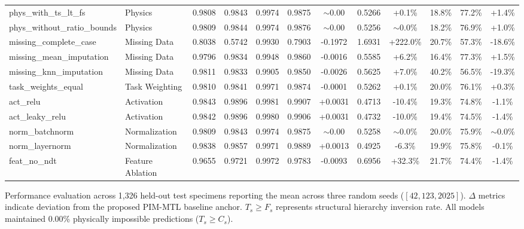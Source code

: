 \documentclass[conference]{IEEEtran}
\begin{document}
\begin{table}[t]
\begin{tabular*}{\textwidth}{@{\extracolsep{\fill}} l l c c c c c c c c c c @{}}
phys\_with\_ts\_lt\_fs & Physics & 0.9808 & 0.9843 & 0.9974 & 0.9875 & $\sim$0.00 & 0.5266 & +0.1\% & 18.8\% & 77.2\% & +1.4\% \\
phys\_without\_ratio\_bounds & Physics & 0.9809 & 0.9844 & 0.9974 & 0.9876 & $\sim$0.00 & 0.5256 & $\sim$0.0\% & 18.2\% & 76.9\% & +1.0\% \\
\midrule
missing\_complete\_case & Missing Data & 0.8038 & 0.5742 & 0.9930 & 0.7903 & -0.1972 & 1.6931 & +222.0\% & 20.7\% & 57.3\% & -18.6\% \\
missing\_mean\_imputation & Missing Data & 0.9796 & 0.9834 & 0.9948 & 0.9860 & -0.0016 & 0.5585 & +6.2\% & 16.4\% & 77.3\% & +1.5\% \\
missing\_knn\_imputation & Missing Data & 0.9811 & 0.9833 & 0.9905 & 0.9850 & -0.0026 & 0.5625 & +7.0\% & 40.2\% & 56.5\% & -19.3\% \\
\midrule
task\_weights\_equal & Task Weighting & 0.9810 & 0.9841 & 0.9971 & 0.9874 & -0.0001 & 0.5262 & +0.1\% & 20.0\% & 76.1\% & +0.3\% \\
\midrule
act\_relu & Activation & 0.9843 & 0.9896 & 0.9981 & 0.9907 & +0.0031 & 0.4713 & -10.4\% & 19.3\% & 74.8\% & -1.1\% \\
act\_leaky\_relu & Activation & 0.9842 & 0.9896 & 0.9980 & 0.9906 & +0.0031 & 0.4732 & -10.0\% & 19.4\% & 74.5\% & -1.4\% \\
\midrule
norm\_batchnorm & Normalization & 0.9809 & 0.9843 & 0.9974 & 0.9875 & $\sim$0.00 & 0.5258 & $\sim$0.0\% & 20.0\% & 75.9\% & $\sim$0.0\% \\
norm\_layernorm & Normalization & 0.9838 & 0.9857 & 0.9971 & 0.9889 & +0.0013 & 0.4925 & -6.3\% & 19.9\% & 75.8\% & -0.1\% \\
\midrule
feat\_no\_ndt & Feature Ablation & 0.9655 & 0.9721 & 0.9972 & 0.9783 & -0.0093 & 0.6956 & +32.3\% & 21.7\% & 74.4\% & -1.4\% \\
\bottomrule
\end{tabular*}
\vspace{0.4ex}
\parbox{\textwidth}{\footnotesize Performance evaluation across 1,326 held-out test specimens reporting the mean across three random seeds ($[42, 123, 2025]$). $\Delta$ metrics indicate deviation from the proposed PIM-MTL baseline anchor. $T_s \ge F_s$ represents structural hierarchy inversion rate. All models maintained 0.00\% physically impossible predictions ($T_s \ge C_s$).}
\end{table}
\end{document}
